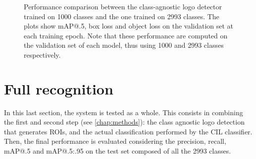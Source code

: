 \begin{figure}[H]
	\centering
    \qquad
    \caption{Performance comparison between the class-agnostic logo detector trained on 1000 classes and the one trained on 2993 classes. The plots show mAP@.5, box loss and object loss on the validation set at each training epoch. Note that these performance are computed on the validation set of each model, thus using 1000 and 2993 classes respectively.}
	\label{fig:exp-det_2993}
\end{figure}


\section{Full recognition}
\label{sec:exp-end2end}
In this last section, the system is tested as a whole.
This consists in combining the first and second step (see \autoref{chap:methods}): the class agnostic logo detection that generates ROIs, and the actual classification performed by the CIL classifier.
Then, the final performance is evaluated considering the precision, recall, mAP@.5 and mAP@.5:.95 on the test set composed of all the 2993 classes.

